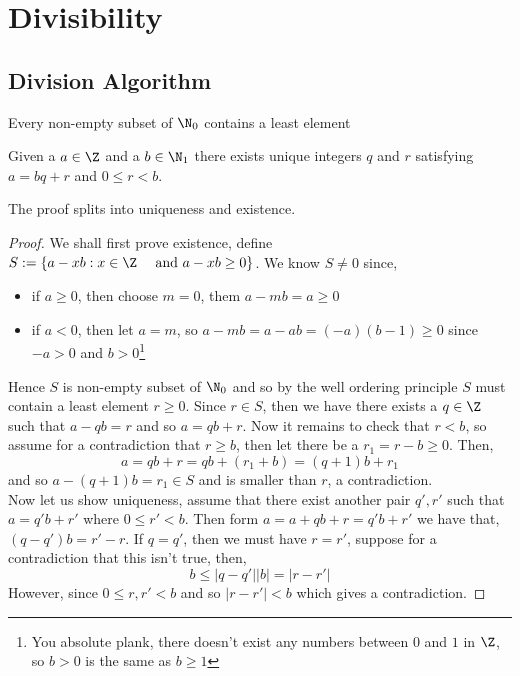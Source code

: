 
\section{Divisibility}

\subsection{Division Algorithm}

\begin{ndefi}
  Every non-empty subset of $\N_0$ contains a least element
\end{ndefi}

\begin{nthm}
  Given a $a\in\Z$ and a $b\in\N_1$ there exists unique integers $q$ and $r$ satisfying $a = bq + r$ and $0\le r < b$.
\end{nthm}
The proof splits into uniqueness and existence.

\begin{proof}
  We shall first prove existence, define $S := \{a - xb : x \in \Z \quad \text{ and } a - xb \ge 0 \}$. We know $S \ne 0$ since,
  \begin{itemize}
    \item if $a \ge 0$, then choose $m = 0$, them $a - mb = a \ge 0$
    \item if $a < 0$, then let $a = m$, so $a - mb = a - ab = (-a)(b-1) \ge 0$ since $-a>0$ and $b > 0$\footnote{You absolute plank, there doesn't exist any numbers between $0$ and $1$ in $\Z$, so $b > 0$ is the same as $b \ge 1$}
  \end{itemize}
  Hence $S$ is non-empty subset of $\N_0$ and so by the well ordering principle $S$ must contain a least element $r \ge 0$. Since $r \in S$, then we have there exists a $q \in\Z$ such that $a - qb = r$ and so $a = qb + r$. Now it remains to check that $r < b$, so assume for a contradiction that $r \ge b$, then let there be a $r_1 = r -b \ge 0$. Then,
  $$ a = qb + r = qb + (r_1 + b) = (q+1)b + r_1 $$
  and so $a - (q+1) b = r_1 \in S$ and is smaller than $r$, a contradiction.\\

  Now let us show uniqueness, assume that there exist another pair $q', r'$ such that $a = q'b+r'$ where $0 \le r' < b$. Then form $a = a + qb + r = q'b + r'$ we have that, $(q - q')b = r' - r$. If $q = q'$, then we must have $r = r'$, suppose for a contradiction that this isn't true, then,
  $$ b \le |q - q'||b| = |r - r'| $$
  However, since $0 \le r, r' < b$ and so $|r - r'| < b$ which gives a contradiction.
\end{proof}

